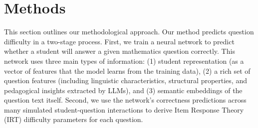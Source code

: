 \documentclass[
    a4paper, %
    10pt, %
    twoside, %
]{LTJournalArticle}
\begin{document}




\section{Methods}

This section outlines our methodological approach. Our method predicts question difficulty in a two-stage process. First, we train a neural network to predict whether a student will answer a given mathematics question correctly. This network uses three main types of information: (1) student representation (as a vector of features that the model learns from the training data), (2) a rich set of question features (including linguistic characteristics, structural properties, and pedagogical insights extracted by LLMs), and (3) semantic embeddings of the question text itself. Second, we use the network's correctness predictions across many simulated student-question interactions to derive Item Response Theory (IRT) difficulty parameters for each question.
\end{document}

